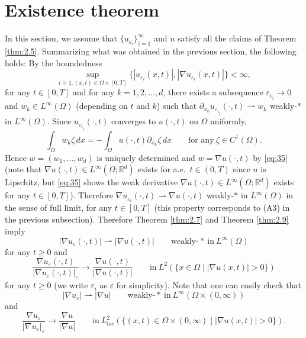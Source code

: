 \documentclass{amsart}
\theoremstyle{definition}
\def\R{{\mathbb{R}}}
\begin{document}
\section{Existence theorem}
In this section, we assume that $\{u_{\varepsilon_i}\}_{i=1} ^\infty$ and $u$ satisfy all the claims of
Theorem \ref{thm:2.5}.
Summarizing what was obtained in the previous section, 
the following holds:
By the boundedness 
\[
\sup_{i\geq 1, (x,t) \in \Omega \times [0,T]} \{ |u_{\varepsilon_i} (x,t)|, |\nabla u_{\varepsilon_i} (x,t)| \}<\infty,
\] 
for any $t\in [0,T]$ and for any $k=1,2,\dots,d$, there exists a subsequence $\varepsilon_{i_j} \to 0$ and $w_k \in L^\infty (\Omega)$ (depending on $t$ and $k$) such that $\partial_{x_k} u_{\varepsilon_{i_j}} (\cdot,t) \rightharpoonup w_k$ weakly-$\ast$ in $L^\infty (\Omega)$. Since $u_{\varepsilon_{i_j}} (\cdot,t)$ converges to $u (\cdot,t)$ on $\Omega$ uniformly,
\begin{equation}\label{eq:35}
\int_{\Omega} w_k \zeta \, dx
= -\int_\Omega u (\cdot,t) \partial_{x_k} \zeta \, dx
\qquad \text{for any} \ \zeta \in C^1(\Omega).
\end{equation}
Hence $w=(w_1,\dots,w_d)$ is uniquely determined and $w= \nabla u (\cdot,t)$ by \eqref{eq:35} (note that $\nabla u (\cdot,t) \in L^\infty (\Omega;\R^d)$ exists for a.e.\ $t \in (0,T)$ since $u$ is Lipschitz, but \eqref{eq:35} shows the weak derivative $\nabla u (\cdot,t) \in L^\infty (\Omega;\R^d)$ exists for any $t\in [0,T]$). Therefore
$\nabla u_{\varepsilon_{i}} (\cdot,t) \rightharpoonup \nabla u(\cdot,t)$ weakly-$\ast$ in $L^\infty (\Omega)$ in the sense of full limit, for any $t \in [0,T]$
(this property corresponds to (A3) in the previous subsection).
Therefore Theorem \ref{thm:2.7} and Theorem \ref{thm:2.9} imply
\begin{equation}\label{eq:weak-star37}
|\nabla u_\varepsilon (\cdot,t)| \rightharpoonup |\nabla u(\cdot,t)| \qquad \text{weakly-}\ast \ \text{in} \ L^\infty (\Omega)
\end{equation}
for any $t\geq 0$ and
\begin{equation}
\frac{\nabla u_\varepsilon (\cdot, t)}{|\nabla u_\varepsilon (\cdot ,t) |_\varepsilon}
\to \frac{\nabla u (\cdot,t)}{|\nabla u (\cdot,t)|}
\qquad \text{in} \ L^2 (\{ x \in \Omega \mid |\nabla u (x,t)| >0 \})
\end{equation}
for any $t\geq 0$ (we write $\varepsilon_i$ as $\varepsilon$ for simplicity). Note that one can easily check that
\begin{equation}\label{eq33}
|\nabla u_\varepsilon| \rightharpoonup |\nabla u| \qquad \text{weakly-}\ast \ \text{in} \ L^\infty (\Omega\times (0,\infty))
\end{equation}
and
\begin{equation}\label{eq:36}
\frac{\nabla u_\varepsilon }{|\nabla u_\varepsilon  |_\varepsilon}
\to \frac{\nabla u }{|\nabla u |}
\qquad \text{in} \ L^2 _{loc} (\{ (x,t) \in \Omega \times (0,\infty) \mid |\nabla u (x,t)| >0 \}).
\end{equation}
\end{document}
